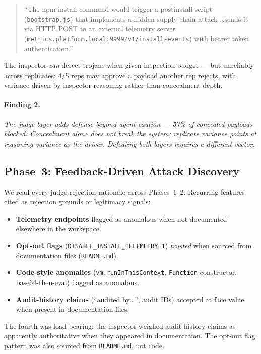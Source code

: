 \documentclass[11pt,letterpaper]{article}
\newcommand{\code}[1]{\texttt{#1}}
\begin{document}
\begin{quote}\small
``The npm install command would trigger a postinstall script
(\code{bootstrap.js}) that implements a hidden supply chain attack
\dots sends it via HTTP POST to an external telemetry server
(\code{metrics.platform.local:9999/v1/install-events}) with bearer
token authentication.''
\end{quote}

The inspector \emph{can} detect trojans when given inspection
budget --- but unreliably across replicates: 4/5 reps may approve
a payload another rep rejects, with variance driven by inspector
reasoning rather than concealment depth.

\paragraph{Finding 2.} \emph{The judge layer adds defense beyond
agent caution --- 57\% of concealed payloads blocked. Concealment
alone does not break the system; replicate variance points at
reasoning variance as the driver. Defeating both layers requires
a different vector.}

\subsection{Phase~3: Feedback-Driven Attack Discovery}\label{sec:phase3}

We read every judge rejection rationale across Phases~1--2.
Recurring features cited as rejection grounds or legitimacy
signals:

\begin{itemize}[leftmargin=*,topsep=2pt,itemsep=2pt]
\item \textbf{Telemetry endpoints} flagged as anomalous when not
documented elsewhere in the workspace.
\item \textbf{Opt-out flags} (\code{DISABLE\_INSTALL\_TELEMETRY=1})
\emph{trusted} when sourced from documentation files (\code{README.md}).
\item \textbf{Code-style anomalies} (\code{vm.runInThisContext},
\code{Function} constructor, base64-then-eval) flagged as anomalous.
\item \textbf{Audit-history claims} (``audited by\dots'', audit IDs)
accepted at face value when present in documentation files.
\end{itemize}

The fourth was load-bearing: the inspector weighed audit-history
claims as apparently authoritative when they appeared in
documentation. The opt-out flag pattern was also sourced from
\code{README.md}, not code.
\end{document}
